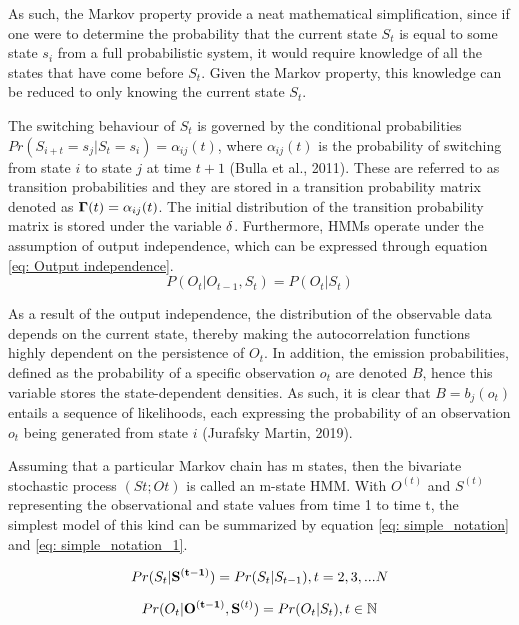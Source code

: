 As such, the Markov property provide a neat mathematical simplification, since if one were to determine the probability that the current state $S_t$ is equal to some state $s_i$ from a full probabilistic system, it would require knowledge of all the states that have come before $S_t$. Given the Markov property, this knowledge can be reduced to only knowing the current state $S_t$. 

The switching behaviour of $S_t$ is governed by the conditional probabilities $Pr(S_{i+t} = s_j| S_t = s_i) = \alpha_{ij}(t)$, where $\alpha_{ij}(t)$ is the probability of switching from state $i$ to state $j$ at time $t + 1$ (Bulla et al., 2011). These are referred to as transition probabilities and they are stored in a transition probability matrix denoted as $\bold{\Gamma}(t) = {\alpha_{ij}(t)}$. The initial distribution of the transition probability matrix is stored under the variable $\bold{\delta}$.  Furthermore, HMMs operate under the assumption of output independence, which can be expressed through equation \ref{eq: Output independence}.
\begin{equation}
    P(O_t|O_{t-1}, S_t) = P(O_t|S_t)
    \label{eq: Output independence}
\end{equation}

As a result of the output independence, the distribution of the observable data depends on the current state, thereby making the autocorrelation functions highly dependent on the persistence of $O_t$. In addition, the emission probabilities, defined as the probability of a specific observation $o_t$ are denoted $B$, hence this variable stores the state-dependent densities. As such, it is clear that $B = b_j(o_t)$ entails a sequence of likelihoods, each expressing the probability of an observation $o_t$ being generated from state $i$ (Jurafsky Martin, 2019).

Assuming that a particular Markov chain has m states, then the bivariate stochastic process
$(St;Ot)$ is called an m-state HMM. With $O^{(t)}$ and $S^{(t)}$ representing the observational and state values from time 1 to time t, the simplest model of this kind can be summarized by equation \ref{eq: simple_notation} and \ref{eq: simple_notation_1}.

\begin{equation}
    Pr(S_t | \bold{S^{(t-1)}}) = Pr(S_t | S_{t-1}),    t=2,3,...N
    \label{eq: simple_notation}
\end{equation} 

\begin{equation}
    Pr(O_t|\bold{O^{(t-1)}}, \bold{S}^{(t)}) = Pr(O_t|S_t), t \in \mathbb{N}
    \label{eq: simple_notation_1}
\end{equation}

